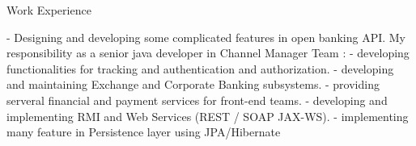\begin{jrsection}{Work Experience}
{\begin{jrdescription}
{            - Designing and developing some complicated features in open banking API.\linebreak
            My responsibility as a senior java developer in Channel Manager Team :\linebreak
            - developing functionalities for tracking and authentication and authorization.\linebreak
            - developing and maintaining Exchange and Corporate Banking subsystems.
            - providing serveral financial and payment services for front-end teams.\linebreak
            - developing and implementing RMI and Web Services (REST / SOAP JAX-WS).\linebreak
            - implementing many feature in Persistence layer using JPA/Hibernate \linebreak
        }
        \end{jrdescription}
    }
\end{jrsection}
